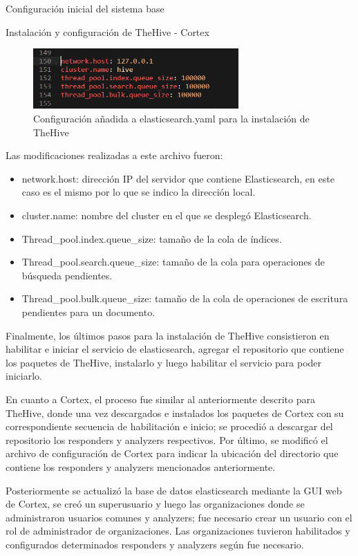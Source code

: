 \begin{section}{Configuración inicial del sistema base}
\begin{subsection}{Instalación y configuración de TheHive - Cortex}
        \begin{figure}[H]
            \centering
            \includegraphics[width=0.7\textwidth]{./iteracion_1_imagenes/figura_39_thehive_conf_elastic.png}
            \caption{Configuración añadida a elasticsearch.yaml para la instalación de TheHive}
            \label{fig:figura_39_thehive_conf}
        \end{figure}
        Las modificaciones realizadas a este archivo fueron:
        \begin{itemize}
            \item network.host: dirección IP del servidor que contiene Elasticsearch, en este caso es el mismo por lo que se indico la dirección local.
            \item cluster.name: nombre del cluster en el que se desplegó Elasticsearch.
            \item Thread\_pool.index.queue\_size: tamaño de la cola de índices.
            \item Thread\_pool.search.queue\_size: tamaño de la cola para operaciones de búsqueda pendientes.
            \item Thread\_pool.bulk.queue\_size: tamaño de la cola de operaciones de escritura pendientes para un documento.
        \end{itemize}
        \par
        Finalmente, los últimos pasos para la instalación de TheHive consistieron en habilitar e iniciar el servicio de elasticsearch, agregar el repositorio que contiene los paquetes de TheHive, instalarlo y luego habilitar el servicio para poder iniciarlo. \par
        En cuanto a Cortex, el proceso fue similar al anteriormente descrito para TheHive, donde una vez descargados e instalados los paquetes de Cortex con su correspondiente secuencia de habilitación e inicio; se procedió a descargar del repositorio los responders y analyzers respectivos. Por último, se modificó el archivo de configuración de Cortex para indicar la ubicación del directorio que contiene los responders y analyzers mencionados anteriormente. \par
        Posteriormente se actualizó la base de datos elasticsearch mediante la GUI web de Cortex, se creó un superusuario y luego las organizaciones donde se administraron usuarios comunes y analyzers; fue necesario crear un usuario con el rol de administrador de organizaciones. Las organizaciones tuvieron habilitados y configurados determinados responders y analyzers según fue necesario. \par

\end{subsection}
\end{section}
